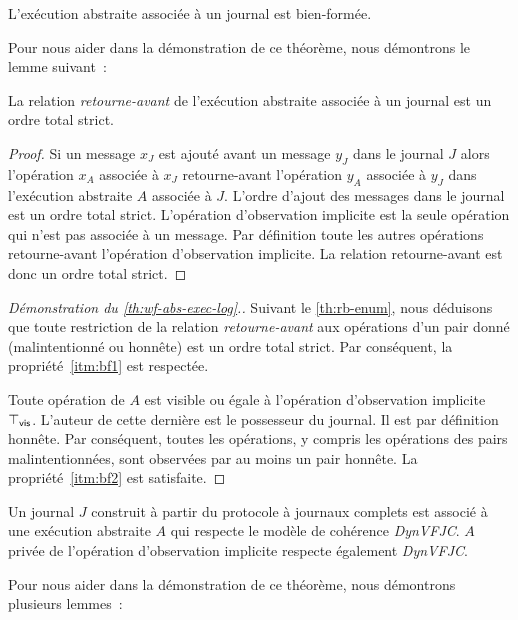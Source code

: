 \begin{theorem}\label{th:wf-abs-exec-log}
L'exécution abstraite associée à un journal est bien-formée.
\end{theorem}

Pour nous aider dans la démonstration de ce théorème, nous démontrons le lemme suivant~:

\begin{lemma}\label{th:rb-enum}
La relation \emph{retourne-avant} de l'exécution abstraite associée à un journal est un ordre total strict.
\end{lemma}
\begin{proof}
Si un message $x_J$ est ajouté avant un message $y_J$ dans le journal $J$ alors l'opération $x_A$ associée à $x_J$ retourne-avant l'opération $y_A$ associée à $y_J$ dans l'exécution abstraite $A$ associée à $J$.
L'ordre d'ajout des messages dans le journal est un ordre total strict.
L'opération d'observation implicite est la seule opération qui n'est pas associée à un message.
Par définition toute les autres opérations retourne-avant l'opération d'observation implicite.
La relation retourne-avant est donc un ordre total strict.
\end{proof}

\begin{proof}[Démonstration du \autoref{th:wf-abs-exec-log}.]
Suivant le \autoref{th:rb-enum}, nous déduisons que toute restriction de la relation \emph{retourne-avant} aux opérations d'un pair donné (malintentionné ou honnête) est un ordre total strict.
Par conséquent, la propriété~\ref{itm:bf1} est respectée.

Toute opération de $A$ est visible ou égale à l'opération d'observation implicite $\top_{\operatorname{\mathsf{vis}}}$.
L'auteur de cette dernière est le possesseur du journal.
Il est par définition honnête.
Par conséquent, toutes les opérations, y compris les opérations des pairs malintentionnées, sont observées par au moins un pair honnête.
La propriété~\ref{itm:bf2} est satisfaite.
\end{proof}


\begin{theorem}\label{th:abs-exec-full-log-consistency}
Un journal $J$ construit à partir du protocole à journaux complets est associé à une exécution abstraite $A$ qui respecte le modèle de cohérence \emph{DynVFJC}.
$A$ privée de l'opération d'observation implicite respecte également \emph{DynVFJC}.
\end{theorem}

Pour nous aider dans la démonstration de ce théorème, nous démontrons plusieurs lemmes~:

